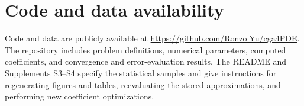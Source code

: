 \section{Code and data availability}
\label{sec:code-data}

Code and data are publicly available at \url{https://github.com/RonzolYu/cga4PDE}.
The repository includes problem definitions, numerical parameters, computed
coefficients, and convergence and error-evaluation results. The README and
Supplements S3--S4 specify the statistical samples and give instructions for
regenerating figures and tables, reevaluating the stored approximations, and
performing new coefficient optimizations.
